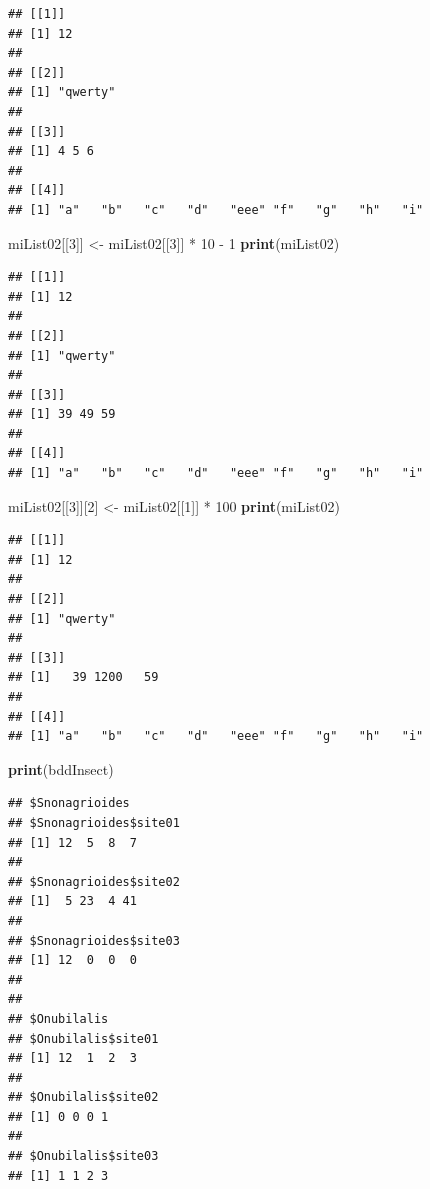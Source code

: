 \documentclass[twoside,symmetric]{book}
\newenvironment{Shaded}{}{}
\newcommand{\DecValTok}[1]{#1}
\newcommand{\KeywordTok}[1]{\textbf{#1}}
\newcommand{\NormalTok}[1]{#1}
\newcommand{\OperatorTok}[1]{#1}
\newcommand{\StringTok}[1]{#1}
\begin{document}
\begin{verbatim}
## [[1]]
## [1] 12
## 
## [[2]]
## [1] "qwerty"
## 
## [[3]]
## [1] 4 5 6
## 
## [[4]]
## [1] "a"   "b"   "c"   "d"   "eee" "f"   "g"   "h"   "i"
\end{verbatim}

\begin{Shaded}
\begin{Highlighting}[]
\NormalTok{miList02[[}\DecValTok{3}\NormalTok{]] <-}\StringTok{ }\NormalTok{miList02[[}\DecValTok{3}\NormalTok{]] }\OperatorTok{*}\StringTok{ }\DecValTok{10} \OperatorTok{-}\StringTok{ }\DecValTok{1}
\KeywordTok{print}\NormalTok{(miList02)}
\end{Highlighting}
\end{Shaded}

\begin{verbatim}
## [[1]]
## [1] 12
## 
## [[2]]
## [1] "qwerty"
## 
## [[3]]
## [1] 39 49 59
## 
## [[4]]
## [1] "a"   "b"   "c"   "d"   "eee" "f"   "g"   "h"   "i"
\end{verbatim}

\begin{Shaded}
\begin{Highlighting}[]
\NormalTok{miList02[[}\DecValTok{3}\NormalTok{]][}\DecValTok{2}\NormalTok{] <-}\StringTok{ }\NormalTok{miList02[[}\DecValTok{1}\NormalTok{]] }\OperatorTok{*}\StringTok{ }\DecValTok{100}
\KeywordTok{print}\NormalTok{(miList02)}
\end{Highlighting}
\end{Shaded}

\begin{verbatim}
## [[1]]
## [1] 12
## 
## [[2]]
## [1] "qwerty"
## 
## [[3]]
## [1]   39 1200   59
## 
## [[4]]
## [1] "a"   "b"   "c"   "d"   "eee" "f"   "g"   "h"   "i"
\end{verbatim}

\begin{Shaded}
\begin{Highlighting}[]
\KeywordTok{print}\NormalTok{(bddInsect)}
\end{Highlighting}
\end{Shaded}

\begin{verbatim}
## $Snonagrioides
## $Snonagrioides$site01
## [1] 12  5  8  7
## 
## $Snonagrioides$site02
## [1]  5 23  4 41
## 
## $Snonagrioides$site03
## [1] 12  0  0  0
## 
## 
## $Onubilalis
## $Onubilalis$site01
## [1] 12  1  2  3
## 
## $Onubilalis$site02
## [1] 0 0 0 1
## 
## $Onubilalis$site03
## [1] 1 1 2 3
\end{verbatim}
\end{document}

